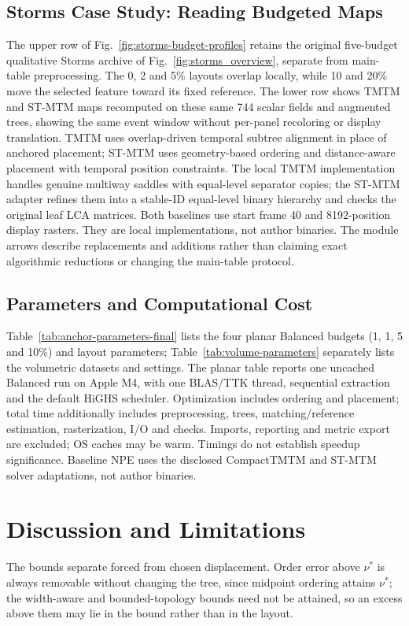 \documentclass{vgtc}                %
\begin{document}
\subsection{Storms Case Study: Reading Budgeted Maps}

The upper row of Fig.~\ref{fig:storms-budget-profiles} retains the original five-budget qualitative Storms archive of Fig.~\ref{fig:storms_overview}, separate from main-table preprocessing. The 0, 2 and 5\% layouts overlap locally, while 10 and 20\% move the selected feature toward its fixed reference. The lower row shows TMTM and ST-MTM maps recomputed on these same 744 scalar fields and augmented trees, showing the same event window without per-panel recoloring or display translation. TMTM uses overlap-driven temporal subtree alignment in place of anchored placement; ST-MTM uses geometry-based ordering and distance-aware placement with temporal position constraints. The local TMTM implementation handles genuine multiway saddles with equal-level separator copies; the ST-MTM adapter refines them into a stable-ID equal-level binary hierarchy and checks the original leaf LCA matrices. Both baselines use start frame 40 and 8192-position display rasters. They are local implementations, not author binaries. The module arrows describe replacements and additions rather than claiming exact algorithmic reductions or changing the main-table protocol.

\subsection{Parameters and Computational Cost}
Table~\ref{tab:anchor-parameters-final} lists the four planar Balanced budgets (1, 1, 5 and 10\%) and layout parameters; Table~\ref{tab:volume-parameters} separately lists the volumetric datasets and settings. The planar table reports one uncached Balanced run on Apple M4, with one BLAS/TTK thread, sequential extraction and the default HiGHS scheduler. Optimization includes ordering and placement; total time additionally includes preprocessing, trees, matching/reference estimation, rasterization, I/O and checks. Imports, reporting and metric export are excluded; OS caches may be warm. Timings do not establish speedup significance. Baseline NPE uses the disclosed CompactTMTM and ST-MTM solver adaptations, not author binaries.

\section{Discussion and Limitations}
The bounds separate forced from chosen displacement. Order error above $\nu^*$ is always removable without changing the tree, since midpoint ordering attains $\nu^*$; the width-aware and bounded-topology bounds need not be attained, so an excess above them may lie in the bound rather than in the layout.
\end{document}
